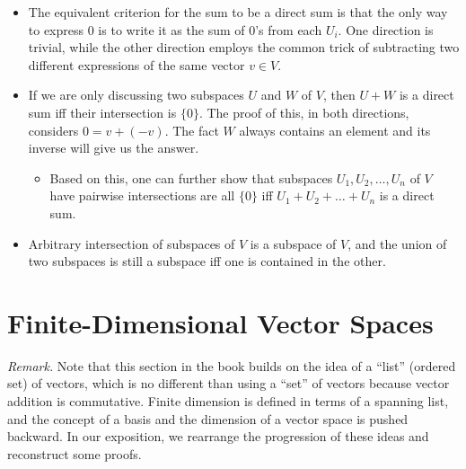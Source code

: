 \documentclass[11pt]{article}
\begin{document}
\begin{itemize}
    \item The equivalent criterion for the sum to be a direct sum is that the only way to express $0$ is to write it as the sum of $0$'s from each $U_i$. One direction is trivial, while the other direction employs the common trick of subtracting two different expressions of the same vector $v \in V$.
    \item If we are only discussing two subspaces $U$ and $W$ of $V$, then $U+W$ is a direct sum iff their intersection is $\{0\}$. The proof of this, in both directions, considers $0 = v + (-v)$. The fact $W$ always contains an element and its inverse will give us the answer.
    \begin{itemize}
    	\item Based on this, one can further show that subspaces $U_1,U_2,\dots,U_n$ of $V$ have pairwise intersections are all $\{0\}$ iff $U_1 + U_2 + \dots + U_n$ is a direct sum.
    \end{itemize}
    \item Arbitrary intersection of subspaces of $V$ is a subspace of $V$, and the union of two subspaces is still a subspace iff one is contained in the other.
\end{itemize}


\newpage
\section{Finite-Dimensional Vector Spaces}

\textit{Remark.} Note that this section in the book builds on the idea of a ``list'' (ordered set) of vectors, which is no different than using a ``set'' of vectors because vector addition is commutative. Finite dimension is defined in terms of a spanning list, and the concept of a basis and the dimension of a vector space is pushed backward. In our exposition, we rearrange the progression of these ideas and reconstruct some proofs.
\end{document}
